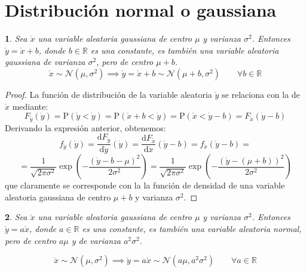 \documentclass[11pt,a4paper,spanish]{article}
\numberwithin{equation}{section}
\numberwithin{table}{section}
\numberwithin{figure}{section}
\theoremstyle{definition}
\theoremstyle{remark}
\theoremstyle{definition}
\theoremstyle{remark}
\theoremstyle{plain}
\newtheorem{prop}{\protect\propositionname}[section]
\theoremstyle{plain}
\theoremstyle{plain}
\theoremstyle{plain}
\theoremstyle{plain}
\theoremstyle{plain}
\providecommand{\propositionname}{Proposición}
\begin{document}
	\section{Distribución normal o gaussiana}
	\begin{prop}
		\label{prop:gaussiana + constante}Sea $\mathring{x}$ una variable
		aleatoria gaussiana de centro $\mu$ y varianza $\sigma^{2}$. Entonces
		$\mathring{y}=\mathring{x}+b$, donde $b\in\mathbb{R}$ es una constante,
		es también una variable aleatoria gaussiana de varianza $\sigma^{2}$,
		pero de centro $\mu+b$.
		\[
		\mathring{x}\sim\mathcal{N}\left(\mu,\sigma^{2}\right)\implies\mathring{y}=\mathring{x}+b\sim\mathcal{N}\left(\mu+b,\sigma^{2}\right)\qquad\forall b\in\mathbb{R}
		\]
	\end{prop}
	\begin{proof}
		La función de distribución de la variable aleatoria $\mathring{y}$
		se relaciona con la de $\mathring{x}$ mediante:
		\[
		F_{\mathring{y}}\left(\dot{y}\right)=\mathrm{P}\left(\mathring{y}<\dot{y}\right)=\mathrm{P}\left(\mathring{x}+b<\dot{y}\right)=\mathrm{P}\left(\mathring{x}<\dot{y}-b\right)=F_{\mathring{x}}\left(\dot{y}-b\right)
		\]
		Derivando la expresión anterior, obtenemos:
		\[
		f_{\mathring{y}}\left(\dot{y}\right)=\frac{\mathrm{d}F_{\mathring{y}}}{\mathrm{d}\dot{y}}\left(\dot{y}\right)=\frac{\mathrm{d}F_{\mathring{x}}}{\mathrm{d}\dot{x}}\left(\dot{y}-b\right)=f_{\mathring{x}}\left(\dot{y}-b\right)=
		\]
		\[
		=\frac{1}{\sqrt{2\pi\sigma^{2}}}\exp\left(-\frac{\left(\dot{y}-b-\mu\right)^{2}}{2\sigma^{2}}\right)=\frac{1}{\sqrt{2\pi\sigma^{2}}}\exp\left(-\frac{\left(\dot{y}-\left(\mu+b\right)\right)^{2}}{2\sigma^{2}}\right)
		\]
		que claramente se corresponde con la la función de densidad de una
		variable aleatoria gaussiana de centro $\mu+b$ y varianza $\sigma^{2}$.
	\end{proof}
	\begin{prop}
		\label{prop:gaussiana * constante}Sea $\mathring{x}$ una variable
		aleatoria gaussiana de centro $\mu$ y varianza $\sigma^{2}$. Entonces
		$\mathring{y}=a\mathring{x}$, donde $a\in\mathbb{R}$ es una constante,
		es también una variable aleatoria normal, pero de centro $a\mu$ y
		de varianza $a^{2}\sigma^{2}$.
		
		\[
		\mathring{x}\sim\mathcal{N}\left(\mu,\sigma^{2}\right)\implies\mathring{y}=a\mathring{x}\sim\mathcal{N}\left(a\mu,a^{2}\sigma^{2}\right)\qquad\forall a\in\mathbb{R}
		\]
	\end{prop}
\end{document}
